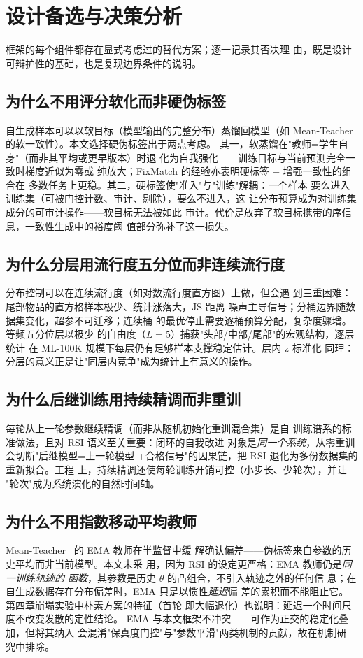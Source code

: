 \section{设计备选与决策分析}
框架的每个组件都存在显式考虑过的替代方案；逐一记录其否决理
由，既是设计可辩护性的基础，也是复现边界条件的说明。

\subsection{为什么不用评分软化而非硬伪标签}
自生成样本可以以软目标（模型输出的完整分布）蒸馏回模型（如
Mean-Teacher 的软一致性）。本文选择硬伪标签出于两点考虑。
其一，软蒸馏在"教师=学生自身"（而非其平均或更早版本）时退
化为自我强化——训练目标与当前预测完全一致时梯度近似为零或
纯放大；FixMatch 的经验亦表明硬标签 + 增强一致性的组合在
多数任务上更稳。其二，硬标签使"准入"与"训练"解耦：一个样本
要么进入训练集（可被门控计数、审计、剔除），要么不进入，这
让分布预算成为对训练集成分的可审计操作——软目标无法被如此
审计。代价是放弃了软目标携带的序信息，一致性生成中的裕度阈
值部分弥补了这一损失。

\subsection{为什么分层用流行度五分位而非连续流行度}
分布控制可以在连续流行度（如对数流行度直方图）上做，但会遇
到三重困难：尾部物品的直方格样本极少、统计涨落大，JS 距离
噪声主导信号；分桶边界随数据集变化，超参不可迁移；连续桶
的最优停止需要逐桶预算分配，复杂度骤增。等频五分位层以极少
的自由度（$L=5$）捕获"头部/中部/尾部"的宏观结构，逐层统计
在 ML-100K 规模下每层仍有足够样本支撑稳定估计。层内 z 标准化
同理：分层的意义正是让"同层内竞争"成为统计上有意义的操作。

\subsection{为什么后继训练用持续精调而非重训}
每轮从上一轮参数继续精调（而非从随机初始化重训混合集）是自
训练谱系的标准做法，且对 RSI 语义至关重要：闭环的自我改进
对象是\emph{同一个系统}，从零重训会切断"后继模型=上一轮模型
+合格信号"的因果链，把 RSI 退化为多份数据集的重新拟合。工程
上，持续精调还使每轮训练开销可控（小步长、少轮次），并让
"轮次"成为系统演化的自然时间轴。

\subsection{为什么不用指数移动平均教师}
Mean-Teacher~\cite{tarvainen2017mean} 的 EMA 教师在半监督中缓
解确认偏差——伪标签来自参数的历史平均而非当前模型。本文未采
用，因为 RSI 的设定更严格：EMA 教师仍是\emph{同一训练轨迹的
函数}，其参数是历史 $\theta$ 的凸组合，不引入轨迹之外的任何信
息；在自生成数据存在分布偏差时，EMA 只是以惯性\emph{延迟}偏
差的累积而不能阻止它。第四章崩塌实验中朴素方案的特征（首轮
即大幅退化）也说明：延迟一个时间尺度不改变发散的定性结论。
EMA 与本文框架不冲突——可作为正交的稳定化叠加，但将其纳入
会混淆"保真度门控"与"参数平滑"两类机制的贡献，故在机制研
究中排除。

